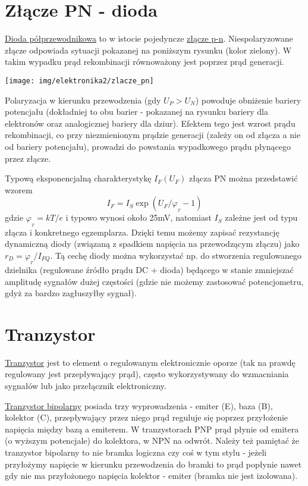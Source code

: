 \documentclass{pdfBooklets}
\begin{document}
\section{Złącze PN - dioda}
\href{https://pl.wikipedia.org/wiki/Dioda półprzewodnikowa}{Dioda półprzewodnikowa} to w istocie pojedyncze \href{https://pl.wikipedia.org/wiki/Złącze p-n}{złącze p-n}.
Niespolaryzowane złącze odpowiada sytuacji pokazanej na poniższym rysunku (kolor zielony).
W takim wypadku prąd rekombinacji równoważony jest poprzez prąd generacji.

\begin{center}\texttt{[image: img/elektronika2/zlacze\_pn]}\end{center}

Polaryzacja w kierunku przewodzenia (gdy $U_P > U_N$) powoduje obniżenie bariery potencjału (dokładniej to obu barier - pokazanej na rysunku bariery dla elektronów oraz analogicznej bariery dla dziur).
Efektem tego jest wzrost prądu rekombinacji, co przy niezmienionym prądzie generacji (zależy on od złącza a nie od bariery potencjału), prowadzi do powstania wypadkowego prądu płynącego przez złącze.

Typową eksponencjalną charakterystykę $I_F(U_F)$ złącza PN można przedstawić wzorem $$I_F = I_S \exp(U_F/\varphi_{_T} -1)$$ gdzie $\varphi_{_T} = kT/e$ i typowo wynosi około 25mV, natomiast $I_S$ zależne jest od typu złącza i konkretnego egzemplarza.
Dzięki temu możemy zapisać rezystancję dynamiczną diody (związaną z spadkiem napięcia na przewodzącym złączu) jako $r_D = \varphi_{_T}/I_{FQ}$.
Tą cechę diody można wykorzystać np. do stworzenia regulowanego dzielnika (regulowane źródło prądu DC + dioda) będącego w stanie zmniejszać amplitudę sygnałów dużej częstości (gdzie nie możemy zastosować potencjometru, gdyż za bardzo zagłuszyłby sygnał).

\section{Tranzystor}

\href{https://pl.wikipedia.org/wiki/Tranzystor}{Tranzystor} jest to element o regulowanym elektronicznie oporze (tak na prawdę regulowany jest przepływający prąd), często wykorzystywany do wzmacniania sygnałów lub jako przełącznik elektroniczny.

\href{https://pl.wikipedia.org/wiki/Tranzystor bipolarny}{Tranzystor bipolarny} posiada trzy wyprowadzenia - emiter (E), baza (B), kolektor (C), przepływający przez niego prąd reguluje się poprzez przyłożenie napięcia między bazą a emiterem. W  tranzystorach PNP prąd płynie od emitera (o wyższym potencjale) do kolektora, w NPN na odwrót. Należy też pamiętać że tranzystor bipolarny to nie bramka logiczna czy coś w tym stylu - jeżeli przyłożymy napięcie w kierunku przewodzenia do bramki to prąd popłynie nawet gdy nie ma przyłożonego napięcia kolektor - emiter (bramka nie jest izolowana).
\end{document}
